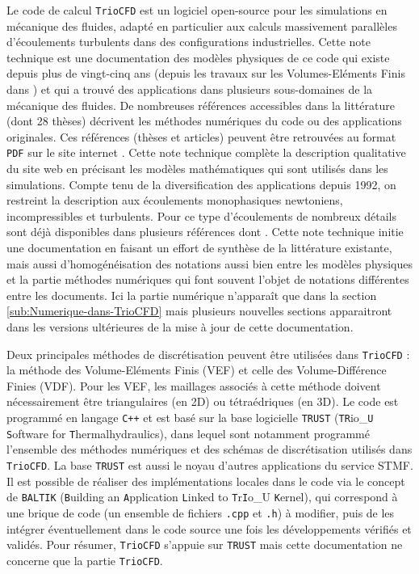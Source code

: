 Le code de calcul \texttt{TrioCFD} est un logiciel open-source \cite{TrioCFD}
pour les simulations en m\'ecanique des fluides, adapt\'e en particulier
aux calculs massivement parall\`eles d\textquoteright \'ecoulements turbulents
dans des configurations industrielles. Cette note technique est une
documentation des mod\`eles physiques de ce code qui existe depuis plus
de vingt-cinq ans (depuis les travaux sur les Volumes-El\'ements Finis
dans \cite{Emon92}) et qui a trouv\'e des applications dans plusieurs
sous-domaines de la m\'ecanique des fluides. De nombreuses r\'ef\'erences
accessibles dans la litt\'erature (dont 28 th\`eses) d\'ecrivent les m\'ethodes
num\'eriques du code ou des applications originales. Ces r\'ef\'erences
(th\`eses et articles) peuvent \^etre retrouv\'ees au format \texttt{PDF}
sur le site internet \cite{TrioCFD}. Cette note technique compl\`ete
la description qualitative du site web en pr\'ecisant les mod\`eles math\'ematiques
qui sont utilis\'es dans les simulations. Compte tenu de la diversification
des applications depuis 1992, on restreint la description aux \'ecoulements
monophasiques newtoniens, incompressibles et turbulents. Pour ce type
d'\'ecoulements de nombreux d\'etails sont d\'ej\`a disponibles dans plusieurs
r\'ef\'erences dont \cite[etc ...]{Angeli_etal_NURETH2015,Angeli_etal_FVCA2017,TrioCFD}.
Cette note technique initie une documentation en faisant un effort
de synth\`ese de la litt\'erature existante, mais aussi d'homog\'en\'eisation
des notations aussi bien entre les \og mod\`eles physiques \fg{} et
la partie \og m\'ethodes num\'eriques \fg{} qui font souvent l'objet
de notations diff\'erentes entre les documents. Ici la partie num\'erique
n'appara\^it que dans la section \ref{sub:Numerique-dans-TrioCFD}
mais plusieurs nouvelles sections apparaitront dans les versions ult\'erieures
de la mise \`a jour de cette documentation.

Deux principales m\'ethodes de discr\'etisation peuvent \^etre utilis\'ees
dans \texttt{TrioCFD} : la m\'ethode des Volume-El\'ements Finis (VEF)
et celle des Volume-Diff\'erence Finies (VDF). Pour les VEF, les maillages
associ\'es \`a cette m\'ethode doivent n\'ecessairement \^etre triangulaires
(en 2D) ou t\'etra\'edriques (en 3D). Le code est programm\'e en langage
\texttt{C++} et est bas\'e sur la base logicielle \texttt{TRUST} (\texttt{TR}io\_\texttt{U}
\texttt{S}oftware for \texttt{T}hermalhydraulics), dans lequel sont
notamment programm\'e l\textquoteright ensemble des m\'ethodes num\'eriques
et des sch\'emas de discr\'etisation utilis\'es dans \texttt{TrioCFD}. La
base \texttt{TRUST} est aussi le noyau d'autres applications du service
STMF. Il est possible de r\'ealiser des impl\'ementations locales dans
le code via le concept de \texttt{BALTIK} (\texttt{B}uilding an \texttt{A}pplication
\texttt{L}inked to \texttt{T}r\texttt{I}o\_U \texttt{K}ernel), qui
correspond \`a une brique de code (un ensemble de fichiers \texttt{.cpp}
et \texttt{.h}) \`a modifier, puis de les int\'egrer \'eventuellement dans
le code source une fois les d\'eveloppements v\'erifi\'es et valid\'es. Pour
r\'esumer, \texttt{TrioCFD} s'appuie sur \texttt{TRUST} mais cette documentation
ne concerne que la partie \texttt{TrioCFD}.

